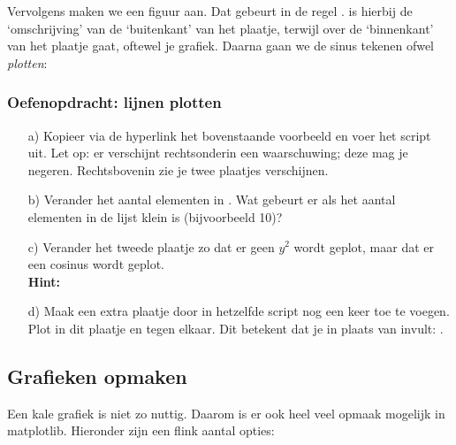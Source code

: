 \documentclass[a4paper,11pt, fleqn]{article}
\begin{document}
Vervolgens maken we een figuur aan. Dat gebeurt in de regel .  is hierbij de `omschrijving' van de `buitenkant' van het plaatje, terwijl  over de `binnenkant' van het plaatje gaat, oftewel je grafiek. Daarna gaan we de sinus tekenen ofwel {\it plotten}:


\subsubsection*{Oefenopdracht: lijnen plotten}
\begin{itemize}
	\item[a)] Kopieer via de hyperlink het bovenstaande voorbeeld en voer het script uit. Let op: er verschijnt rechtsonderin een waarschuwing; deze mag je negeren. Rechtsbovenin zie je twee plaatjes verschijnen.
	
	\item[b)] Verander het aantal elementen in . Wat gebeurt er als het aantal elementen in de lijst klein is (bijvoorbeeld 10)?

	\item[c)] Verander het tweede plaatje zo dat er geen $y^2$ wordt geplot, maar dat er een cosinus wordt geplot. \\
	{\bf Hint:} 

	\item[d)] Maak een extra plaatje door in hetzelfde script nog een keer  toe te voegen. Plot in dit plaatje  en  tegen elkaar. Dit betekent dat je in plaats van  invult: .
\end{itemize}

\subsection{Grafieken opmaken}

Een kale grafiek is niet zo nuttig. Daarom is er ook heel veel opmaak mogelijk in matplotlib. Hieronder zijn een flink aantal opties:
\end{document}
